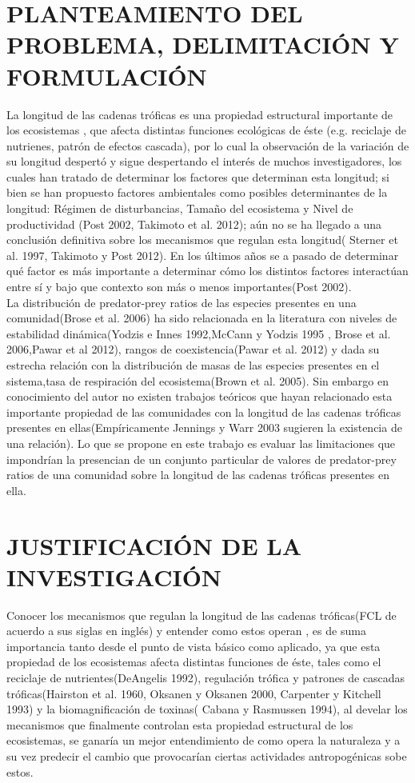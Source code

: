 \documentclass[a4paper,11pt]{article}
\begin{document}
\section{PLANTEAMIENTO DEL PROBLEMA, DELIMITACI\'ON Y FORMULACI\'ON}
La longitud de las cadenas tr\'oficas es una propiedad estructural importante de los ecosistemas
,  que afecta distintas funciones ecol\'ogicas de \'este (e.g. reciclaje de nutrienes, patr\'on de efectos cascada), por lo cual  la observaci\'on de la variaci\'on de su longitud despert\'o y sigue despertando el inter\'es de muchos investigadores, los cuales han tratado de determinar los factores que determinan esta longitud; si bien se han propuesto factores ambientales como posibles determinantes de la longitud: R\'egimen de disturbancias, Tama\~no del ecosistema y Nivel de productividad (Post 2002, Takimoto et al. 2012); a\'un no se ha llegado a una conclusi\'on definitiva sobre los mecanismos que regulan esta longitud( Sterner et al. 1997, Takimoto y Post 2012). En los \'ultimos a\~nos se a pasado de determinar qu\'e factor es m\'as importante a determinar c\'omo los distintos factores interact\'uan entre s\'i y bajo que contexto son m\'as o menos importantes(Post 2002).\\
La distribuci\'on de predator-prey ratios de las especies presentes en una comunidad(Brose et al. 2006) ha sido relacionada en la literatura con niveles de estabilidad din\'amica(Yodzis e Innes 1992,McCann y Yodzis 1995 , Brose et al. 2006,Pawar et al 2012), rangos de coexistencia(Pawar et al. 2012) y dada su estrecha relaci\'on con la distribuci\'on de masas de las especies presentes en el sistema,tasa de respiraci\'on del ecosistema(Brown et al. 2005). Sin embargo en conocimiento del autor no existen trabajos te\'oricos que hayan relacionado esta importante propiedad de las comunidades con la longitud de las cadenas tr\'oficas presentes en ellas(Emp\'iricamente Jennings y Warr 2003 sugieren la existencia de una relaci\'on).
Lo que se propone en este trabajo es evaluar las limitaciones que impondr\'ian la presencian de un conjunto particular de valores de predator-prey ratios de una comunidad sobre la longitud de las cadenas tr\'oficas presentes en ella.


\section{JUSTIFICACI\'ON DE LA INVESTIGACI\'ON}
Conocer los mecanismos que regulan la longitud de las cadenas tr\'oficas(FCL de acuerdo a sus siglas en ingl\'es) y entender como estos operan , es de suma importancia tanto desde el punto de vista b\'asico como aplicado, ya que esta propiedad de los ecosistemas afecta distintas funciones de \'este, tales como el reciclaje de nutrientes(DeAngelis 1992), regulaci\'on tr\'ofica y patrones de cascadas tr\'oficas(Hairston et al. 1960, Oksanen y Oksanen 2000, Carpenter y Kitchell 1993) y la biomagnificaci\'on de toxinas( Cabana y Rasmussen 1994), al develar los mecanismos que finalmente controlan esta propiedad estructural de los ecosistemas, se ganar\'ia un mejor entendimiento de como opera la naturaleza y a su vez predecir el cambio que provocar\'ian ciertas actividades antropog\'enicas sobe estos.
\end{document}
